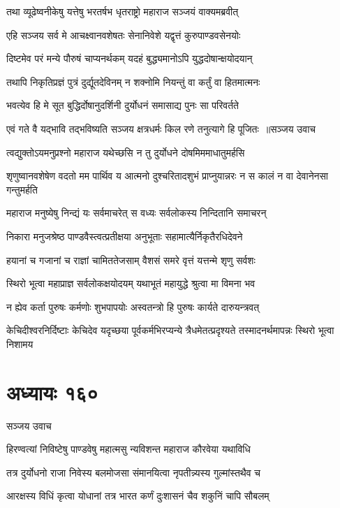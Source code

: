 \twolineshloka
{तथा व्यूढेष्वनीकेषु यत्तेषु भरतर्षभ}
{धृतराष्ट्रो महाराज सञ्जयं वाक्यमब्रवीत्}


\twolineshloka
{एहि सञ्जय सर्व मे आचक्ष्वानवशेषतः}
{सेनानिवेशे यद्वृत्तं कुरुपाण्डवसेनयोः}


\twolineshloka
{दिष्टमेव परं मन्ये पौरुषं चाप्यनर्थकम्}
{यदहं बुद्ध्यमानोऽपि युद्धदोषान्क्षयोदयान्}


\twolineshloka
{तथापि निकृतिप्रज्ञं पुत्रं दुर्द्यूतदेविनम्}
{न शक्नोमि नियन्तुं वा कर्तुं वा हितमात्मनः}


\twolineshloka
{भवत्येव हि मे सूत बुद्धिर्दोषानुदर्शिनी}
{दुर्योधनं समासाद्य पुनः सा परिवर्तते}


\threelineshloka
{एवं गते वै यद्भावि तद्भविष्यति सञ्जय}
{क्षत्रधर्मः किल रणे तनुत्यागे हि पूजितः ॥सञ्जय उवाच}
{}


\twolineshloka
{त्वद्युक्तोऽयमनुप्रश्नो महाराज यथेच्छसि}
{न तु दुर्योधने दोषमिममाधातुमर्हसि}


\threelineshloka
{शृणुष्वानवशेषेण वदतो मम पार्थिव}
{य आत्मनो दुश्चरितादशुभं प्राप्नुयान्नरः}
{न स कालं न वा देवानेनसा गन्तुमर्हति}


\twolineshloka
{महाराज मनुष्येषु निन्द्यं यः सर्वमाचरेत्}
{स वध्यः सर्वलोकस्य निन्दितानि समाचरन्}


\twolineshloka
{निकारा मनुजश्रेष्ठ पाण्डवैस्त्वत्प्रतीक्षया}
{अनुभूताः सहामात्यैर्निकृतैरधिदेवने}


\twolineshloka
{हयानां च गजानां च राज्ञां चामिततेजसाम्}
{वैशसं समरे वृत्तं यत्तन्मे शृणु सर्वशः}


\twolineshloka
{स्थिरो भूत्वा महाप्राज्ञ सर्वलोकक्षयोदयम्}
{यथाभूतं महायुद्धे श्रुत्वा मा विमना भव}


\twolineshloka
{न ह्येव कर्ता पुरुषः कर्मणोः शुभपापयोः}
{अस्वतन्त्रो हि पुरुषः कार्यते दारुयन्त्रवत्}


\threelineshloka
{केचिदीश्वरनिर्दिष्टाः केचिदेव यदृच्छया}
{पूर्वकर्मभिरप्यन्ये त्रैधमेतत्प्रदृश्यते}
{तस्मादनर्थमापन्नः स्थिरो भूत्वा निशामय}


\chapter{अध्यायः १६०}
\twolineshloka
{सञ्जय उवाच}
{}


\twolineshloka
{हिरण्वत्यां निविष्टेषु पाण्डवेषु महात्मसु}
{न्यविशन्त महाराज कौरवेया यथाविधि}


\twolineshloka
{तत्र दुर्योधनो राजा निवेस्य बलमोजसा}
{संमानयित्वा नृपतीन्न्यस्य गुल्मांस्तथैव च}


\twolineshloka
{आरक्षस्य विधिं कृत्वा योधानां तत्र भारत}
{कर्णं दुःशासनं चैव शकुनिं चापि सौबलम्}


